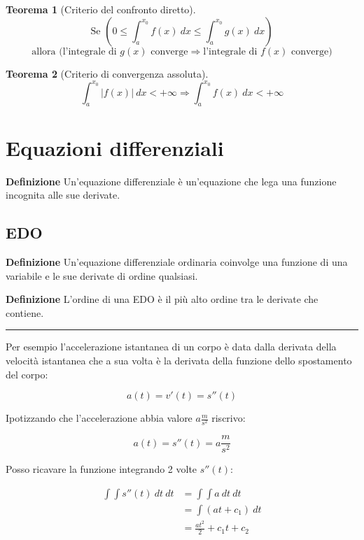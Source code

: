 \documentclass{article}
\newtheorem{theorem}{Teorema}
\begin{document}
\begin{theorem}[Criterio del confronto diretto]
    $$\text{Se }\left(0\leq\int_a^{x_0}f(x)\ dx\leq\int_a^{x_0}g(x)\ dx\right)$$
    $$\text{allora\  (l'integrale di } g(x)\text{ converge}\Rightarrow\text{l'integrale di } f(x) \text{ converge)}$$\newline
\end{theorem}

\begin{theorem}[Criterio di convergenza assoluta]
    $$\int_a^{x_0}|f(x)|\ dx<+\infty\Rightarrow\int_a^{x_0}f(x)\ dx<+\infty$$
\end{theorem}

\newpage

\section{Equazioni differenziali}

\textbf{Definizione} Un'equazione differenziale è un'equazione che lega una funzione incognita alle sue derivate.

\subsection{EDO}

\textbf{Definizione} Un'equazione differenziale ordinaria coinvolge una funzione di una variabile e le sue derivate di ordine qualsiasi.\newline

\noindent\textbf{Definizione} L'ordine di una EDO è il più alto ordine tra le derivate che contiene.

\vspace{5pt}

\noindent\rule{\textwidth}{0.5pt}

\noindent Per esempio l'accelerazione istantanea di un corpo è data dalla derivata della velocità istantanea che a sua volta è la derivata della funzione dello spostamento del corpo:

$$a(t)=v'(t)=s''(t)$$\newline

\noindent Ipotizzando che l'accelerazione abbia valore $a\frac{m}{s^2}$ riscrivo:

$$a(t)=s''(t)=a\frac{m}{s^2}$$\newline

\noindent Posso ricavare la funzione integrando 2 volte $s''(t)$:

\begin{equation}
    \nonumber
    \begin{split}
        \int\int s''(t)\ dt\ dt&=\int\int a\ dt\ dt\\
        &=\int(at+c_1)\ dt\\
        &=\frac{at^2}{2}+c_1t+c_2
    \end{split}
\end{equation}
\end{document}
